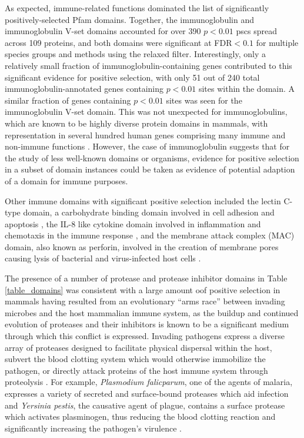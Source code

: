 As expected, immune-related functions dominated the list of
significantly positively-selected Pfam domains. Together, the
immunoglobulin and immunoglobulin V-set domains accounted for over 390
$p<0.01$ \acp{psc} spread across 109 proteins, and both domains were
significant at FDR$<0.1$ for multiple species groups and methods using
the relaxed \sw filter. Interestingly, only a relatively small
fraction of immunoglobulin-containing genes contributed to this
significant evidence for positive selection, with only 51 out of 240
total immunoglobulin-annotated genes containing $p<0.01$ sites within
the domain. A similar fraction of genes containing $p<0.01$ sites was
seen for the immunoglobulin V-set domain. This was not unexpected for
immunoglobulins, which are known to be highly diverse protein domains
in mammals, with representation in several hundred human genes
comprising many immune and non-immune functions
\citep{Lander2001}. However, the case of immunoglobulin suggests that
for the study of less well-known domains or organisms, evidence for
positive selection in a subset of domain instances could be taken as
evidence of potential adaption of a domain for immune purposes.

Other immune domains with significant positive selection included the
lectin C-type domain, a carbohydrate binding domain involved in cell
adhesion and apoptosis \citep{Cambi2009}, the IL-8 like cytokine
domain involved in inflammation and chemotaxis in the immune response
\citep{Stein2005}, and the membrane attack complex (MAC) domain, also
known as perforin, involved in the creation of membrane pores causing
lysis of bacterial and virus-infected host cells \citep{Lovelace2011}.

The presence of a number of protease and protease inhibitor domains in
Table \ref{table_domains} was consistent with a large amount oof
positive selection in mammals having resulted from an evolutionary
``arms race'' between invading microbes and the host mammalian immune
system, as the buildup and continued evolution of proteases and their
inhibitors is known to be a significant medium through which this
conflict is expressed. Invading pathogens express a diverse array of
proteases designed to facilitate physical dispersal within the host,
subvert the blood clotting system which would otherwise immobilize the
pathogen, or directly attack proteins of the host immune system
through proteolysis \citep{Armstrong2006}. For example,
\emph{Plasmodium falicparum}, one of the agents of malaria, expresses
a variety of secreted and surface-bound proteases which aid infection
\citep{McKerrow1993} and \emph{Yersinia pestis}, the causative agent
of plague, contains a surface protease which activates plasminogen,
thus reducing the blood clotting reaction and significantly increasing
the pathogen's virulence \citep{Sodeinde1992}.

